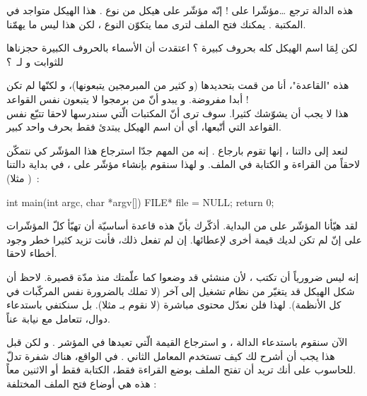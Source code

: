 هذه الدالة ترجع \dots مؤشّرا على
 !
إنّه مؤشّر على هيكل من نوع
.
هذا الهيكل متواجد في المكتبة
.
يمكنك فتح الملف لترى مما يتكوّن النوع
،
لكن هذا ليس ما يهمّنا.

\begin{question}
  لكن لِمَا اسم الهيكل كله بحروف كبيرة ؟ اعتقدت أن الأسماء بالحروف الكبيرة حجزناها للثوابت و لـ~؟
\end{question}

هذه "القاعدة"، أنا من قمت بتحديدها (و كثير من المبرمجين يتبعونها)، و لكنّها لم تكن أبدا مفروضة. و يبدو أنّ من برمجوا
لا يتبعون نفس القواعد !\\
هذا لا يجب أن يشوّشك كثيرا. سوف ترى أنّ المكتبات الّتي سندرسها لاحقا تتبّع نفس القواعد التي أتّبعها، أي أن اسم الهيكل يبتدئ فقط بحرف واحد كبير.

لنعد إلى دالتنا
،
إنها تقوم بارجاع
.
إنه من المهم جدّا استرجاع هذا المؤشّر كي نتمكّن لاحقاً من القراءة و الكتابة في الملف.  و لهذا سنقوم بإنشاء مؤشّر على
،
في بداية دالتنا
(
مثلا)~:

\begin{Csource}
int main(int argc, char *argv[])
{
	FILE* file = NULL;
	return 0;
}
\end{Csource}

لقد هيّأنا المؤشّر على
من البداية. أذكّرك بأنّ هذه قاعدة أساسيّة أن تهيّأ كلّ المؤشّرات على
إنّ لم تكن لديك قيمة أخرى لإعطائها. إن لم تفعل ذلك، فأنت تزيد كثيرا خطر وجود أخطاء لاحقا.

\begin{information}
  إنه ليس ضرورياً أن تكتب
،
لأن منشئي
قد وضعوا
كما علّمتك منذ مدّة قصيرة.
لاحظ أن شكل الهيكل قد يتغيّر من نظام تشغيل إلى آخر (لا تملك بالضرورة نفس المركّبات في كل الأنظمة). لهذا فلن نعدّل محتوى
مباشرة (لا نقوم بـ
مثلا). بل سنكتفي باستدعاء دوال، تتعامل مع
نيابة عناً.
\end{information}

الآن سنقوم باستدعاء الدالة
،
و استرجاع القيمة الّتي تعيدها في المؤشر
.
و لكن قبل هذا يجب أن أشرح لك كيف تستخدم المعامل الثاني
.
في الواقع، هناك شفرة تدلّ للحاسوب على أنك تريد أن تفتح الملف بوضع القراءة فقط، الكتابة فقط أو الاثنين معاً.\\
هذه هي أوضاع فتح الملف المختلفة :

